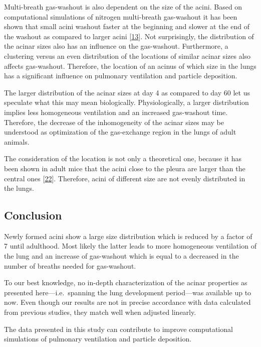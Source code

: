 \documentclass[
  american,
]{article}
\begin{document}
Multi-breath gas-washout is also dependent on the size of the acini.
Based on computational simulations of nitrogen multi-breath gas-washout it has been shown that small acini washout faster at the beginning and slower at the end of the washout as compared to larger acini {[}\protect\hyperlink{ref-eb0gk6VO}{13}{]}.
Not surprisingly, the distribution of the acinar sizes also has an influence on the gas-washout.
Furthermore, a clustering versus an even distribution of the locations of similar acinar sizes also affects gas-washout.
Therefore, the location of an acinus of which size in the lungs has a significant influence on pulmonary ventilation and particle deposition.

The larger distribution of the acinar sizes at day 4 as compared to day 60 let us speculate what this may mean biologically.
Physiologically, a larger distribution implies less homogeneous ventilation and an increased gas-washout time.
Therefore, the decrease of the inhomogeneity of the acinar sizes may be understood as optimization of the gas-exchange region in the lungs of adult animals.

The consideration of the location is not only a theoretical one, because it has been shown in adult mice that the acini close to the pleura are larger than the central ones {[}\protect\hyperlink{ref-RGBeCf8v}{22}{]}.
Therefore, acini of different size are not evenly distributed in the lungs.

\hypertarget{conclusion}{%
\subsection{Conclusion}\label{conclusion}}

Newly formed acini show a large size distribution which is reduced by a factor of 7 until adulthood.
Most likely the latter leads to more homogeneous ventilation of the lung and an increase of gas-washout which is equal to a decreased in the number of breaths needed for gas-washout.

To our best knowledge, no in-depth characterization of the acinar properties as presented here---i.e.~spanning the lung development period---was available up to now.
Even though our results are not in precise accordance with data calculated from previous studies, they match well when adjusted linearly.

The data presented in this study can contribute to improve computational simulations of pulmonary ventilation and particle deposition.
\end{document}
